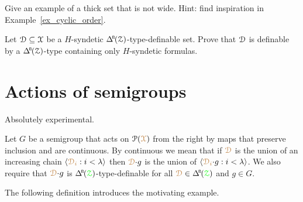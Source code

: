 \begin{exercise}
  Give an example of a thick set that is not wide.
  Hint: find inspiration in Example~\ref{ex_cyclic_order}.
\end{exercise}

\begin{exercise}\label{ex_syndetic_type_vs_formulas}
  Let $\EuScript D\subseteq\EuScript X$ be a $H$-syndetic $\BDelta(\Z)$-type-definable set.
  Prove that $\EuScript D$ is definable by a $\BDelta(\Z)$-type containing only $H$-syndetic formulas.
\end{exercise}



\section{Actions of semigroups}\label{Qactions}

\noindent\llap{\textcolor{red}{\Large\warning}\kern1.5ex}\ignorespaces
Absolutely experimental.

Let $G$ be a semigroup that acts on $\EuScript P({\color{brown}\EuScript X})$ from the right by maps that preserve inclusion and are continuous.
By continuous we mean that if ${\color{brown}\EuScript D}$ is the union of an increasing chain $\langle{\color{brown}\EuScript D_i}:i<\lambda\rangle$ then ${\color{brown}\EuScript D}{\cdot}g$ is the union of $\langle{\color{brown}\EuScript D_i}{\cdot}g:i<\lambda\rangle$.
We also require that ${\color{brown}\EuScript D}{\cdot}g$ is $\BDelta(\grZ)$-type-definable for all $\mrD\in\BDelta(\grZ)$ and $g\in G$.

The following definition introduces the motivating example.

